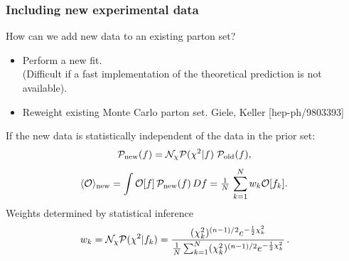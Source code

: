 \documentclass[10pt]{beamer}
\newcommand{\be}{\begin{equation*}}
\newcommand{\ee}{\end{equation*}}
\def\smallfrac#1#2{\hbox{${{#1}\over {#2}}$}}
\begin{document}
\begin{frame}
\frametitle{Including new experimental data}
How can we add new data to an existing parton set?

\begin{itemize}
		\item<1-> Perform a new fit.\\
		{\small (Difficult if a fast implementation of the theoretical prediction is not available).}
		\item<1-> Reweight existing Monte Carlo parton set. {\small \color{blue} Giele, Keller [hep-ph/9803393] }\\
\end{itemize}
If the new data is statistically independent of the data in the prior set:
\be
\mathcal{P}_{\rm new}(f)
= \mathcal{N}_{\chi}\mathcal{P}(\chi^2|f)\;\mathcal{P}_{\rm old}(f),
\ee
		\be \langle\mathcal{O}\rangle_{\mathrm {new}}=\int \mathcal{O}[f] \, \mathcal{P}_{ \mathrm {new}}(f)\,Df=\smallfrac{1}{N}\,\sum_{k=1}^{N}w_k\mathcal{O}[f_k].\,  \ee
Weights determined by statistical inference
\be w_k =\mathcal{N}_\chi\mathcal{P}(\chi^2|f_k) = 
\frac{(\chi^{2}_k)^{(n-1)/2} 
e^{-\frac{1}{2}\chi^{2}_k}}
{\smallfrac{1}{N}\sum_{k=1}^{N}(\chi^{2}_k)^{(n-1)/2}
e^{-\frac{1}{2}\chi^{2}_k}}\, .\ee
{}

\end{frame}
\end{document}

